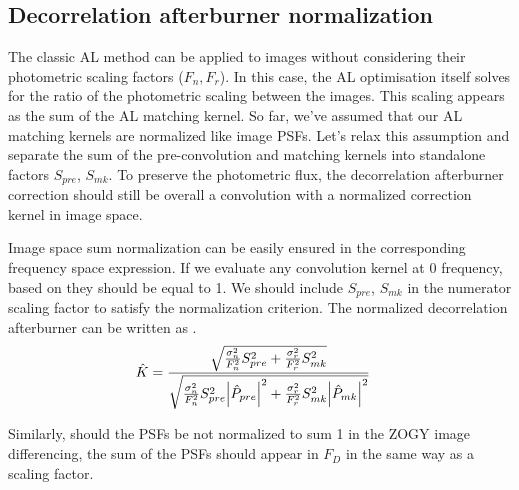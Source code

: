 \subsection{Decorrelation afterburner normalization}
\par The classic AL method can be applied to images without
considering their photometric scaling factors (\(F_n, F_r\)). In this
case, the AL optimisation itself solves for the ratio of the
photometric scaling between the images. This scaling appears as the
sum of the AL matching kernel. So far, we've assumed that our AL
matching kernels are normalized like image PSFs. Let's relax this
assumption and separate the sum of the pre-convolution and matching
kernels into standalone factors \(S_{pre}\), \(S_{mk}\). To preserve
the photometric flux, the decorrelation afterburner correction should
still be overall a convolution with a normalized correction kernel in
image space.
%
\par Image space sum normalization can be easily ensured in the
corresponding frequency space expression. If we evaluate any
convolution kernel at 0 frequency, based on  they
should be equal to 1. We should include \(S_{pre}\), \(S_{mk}\) in the
numerator scaling factor to satisfy the normalization criterion. The
normalized decorrelation afterburner can be written as .
%
\begin{align}
  \hat{K} &= \frac{\sqrt{\frac{\sigma_n^2}{F_n^2}S_{pre}^2 + \frac{\sigma_r^2}{F_r^2}S_{mk}^2}}
  {\sqrt{\frac{\sigma_n^2}{F_n^2}S_{pre}^2\abs{\hat{P}_{pre}}^2 + \frac{\sigma_r^2}{F_r^2}S_{mk}^2
  \abs{\hat{P}_{mk}}^2}}
\label{eq:KPre}
\end{align}
%
\par Similarly, should the PSFs be not normalized to sum 1 in the ZOGY
image differencing, the sum of the PSFs should appear in \(F_{D}\) in
the same way as a scaling factor.
%
